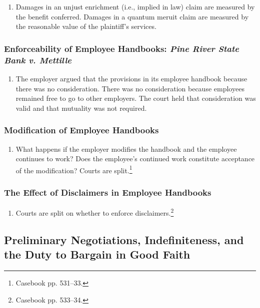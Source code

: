 \begin{enumerate}
    \item Damages in an unjust enrichment (i.e., implied in law) claim are 
    measured by the benefit conferred. Damages in a quantum meruit claim are 
    measured by the reasonable value of the plaintiff's services.
\end{enumerate}

\subsubsection{Enforceability of Employee Handbooks: \emph{Pine River State 
Bank v. Mettille}}

\begin{enumerate}
    \item The employer argued that the provisions in its employee handbook 
    because there was no consideration. There was no consideration because 
    employees remained free to go to other employers. The court held that 
    consideration was valid and that mutuality was not required.
\end{enumerate}

\subsubsection{Modification of Employee Handbooks}

\begin{enumerate}
    \item What happens if the employer modifies the handbook and the employee 
    continues to work? Does the employee's continued work constitute 
    acceptance of the modification? Courts are split.\footnote{Casebook pp. 
    531--33.}
\end{enumerate}

\subsubsection{The Effect of Disclaimers in Employee Handbooks}

\begin{enumerate}
    \item Courts are split on whether to enforce 
    disclaimers.\footnote{Casebook pp. 533--34.}
\end{enumerate}

\subsection{Preliminary Negotiations, Indefiniteness, and the Duty to Bargain 
in Good Faith}

